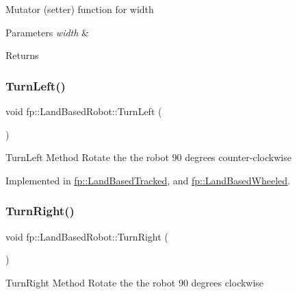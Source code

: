 Mutator (setter) function for width 
\begin{DoxyParams}{Parameters}
{\em width} & \\
\hline
\end{DoxyParams}
\begin{DoxyReturn}{Returns}

\end{DoxyReturn}
\mbox{\label{classfp_1_1_land_based_robot_acd135f01e40d4f2e32739156b56c722f}} 
\subsubsection{\texorpdfstring{Turn\+Left()}{TurnLeft()}}
{\footnotesize\ttfamily void fp\+::\+Land\+Based\+Robot\+::\+Turn\+Left (\begin{DoxyParamCaption}{ }\end{DoxyParamCaption})\hspace{0.3cm}{\ttfamily [pure virtual]}}

Turn\+Left Method Rotate the the robot 90 degrees counter-\/clockwise 

Implemented in \hyperlink{classfp_1_1_land_based_tracked_a63141c32f8f81c301be4126297103a41}{fp\+::\+Land\+Based\+Tracked}, and \hyperlink{classfp_1_1_land_based_wheeled_a240c5e9cf72006ac2f99f8e1dfc4dc5d}{fp\+::\+Land\+Based\+Wheeled}.

\mbox{\label{classfp_1_1_land_based_robot_aa905ba0f9b2670bea138df1e5d6836ff}} 
\subsubsection{\texorpdfstring{Turn\+Right()}{TurnRight()}}
{\footnotesize\ttfamily void fp\+::\+Land\+Based\+Robot\+::\+Turn\+Right (\begin{DoxyParamCaption}{ }\end{DoxyParamCaption})\hspace{0.3cm}{\ttfamily [pure virtual]}}

Turn\+Right Method Rotate the the robot 90 degrees clockwise 

